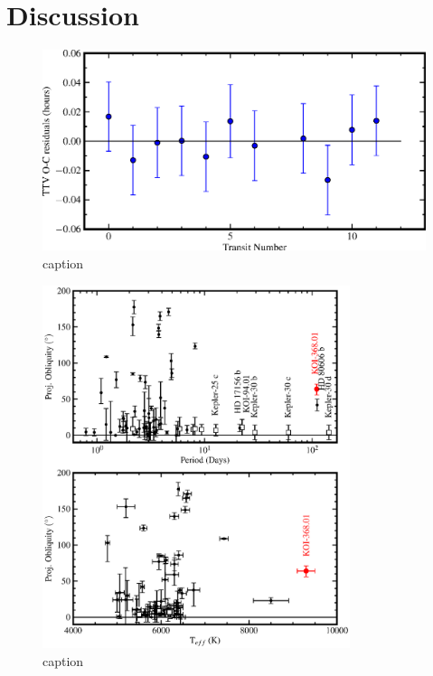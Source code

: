 \documentclass[preprint]{emulateapj}
\begin{document}
\section{Discussion}
\label{sec:discussion}

\begin{figure}
\includegraphics[width=0.9\linewidth]{TTV.eps}
\caption{caption}
\label{fig:TTV}
\end{figure}


\begin{figure}[h]
  \centering
  \includegraphics[width=9cm]{period_obliq.eps}
  \caption{caption}
  \label{fig:periodobliq}
\end{figure}



\end{document}
